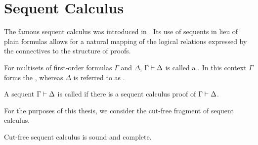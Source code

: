 \section{Sequent Calculus}

The famous sequent calculus was introduced in \cite{Gentzen}.
Its use of sequents in lieu of plain formulas allows for a natural mapping of the logical relations expressed by the connectives to the structure of proofs.

\begin{defi} 
	For multisets of first-order formulas $\Gamma$ and $\Delta$,  $\Gamma \vdash \Delta$ is called a . 
	In this context $\Gamma$ forms the , whereas $\Delta$ is referred to as .

	A sequent $\Gamma \vdash \Delta$ is called  if there is a sequent calculus proof of $\Gamma \vdash \Delta$.
\end{defi}

For the purposes of this thesis, we consider the cut-free fragment of sequent calculus.

\begin{thm}
	Cut-free sequent calculus is sound and complete.
\end{thm}


